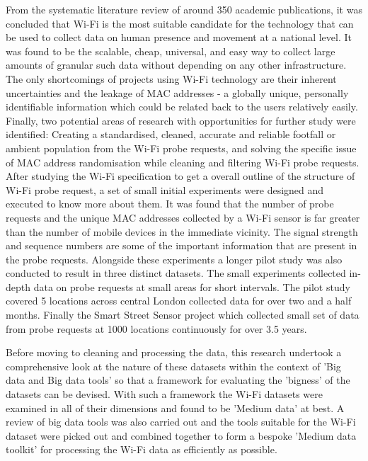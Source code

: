 From the systematic literature review of around 350 academic publications, it was concluded that Wi-Fi is the most suitable candidate for the technology that can be used to collect data on human presence and movement at a national level.
It was found to be the scalable, cheap, universal, and easy way to collect large amounts of granular such data without depending on any other infrastructure.
The only shortcomings of projects using Wi-Fi technology are their inherent uncertainties and the leakage of MAC addresses - a globally unique, personally identifiable information which could be related back to the users relatively easily.
Finally, two potential areas of research with opportunities for further study were identified:  Creating a standardised, cleaned, accurate and reliable footfall or ambient population from the Wi-Fi probe requests, and solving the specific issue of MAC address randomisation while cleaning and filtering Wi-Fi probe requests. 
After studying the Wi-Fi specification to get a overall outline of the structure of Wi-Fi probe request, a set of small initial experiments were designed and executed to know more about them.
It was found that the number of probe requests and the unique MAC addresses collected by a Wi-Fi sensor is far greater than the number of mobile devices in the immediate vicinity.
The signal strength and sequence numbers are some of the important information that are present in the probe requests.
Alongside these experiments a longer pilot study was also conducted to result in three distinct datasets.
The small experiments collected in-depth data on probe requests at small areas for short intervals.
The pilot study covered 5 locations across central London collected data for over two and a half months.
Finally the Smart Street Sensor project which collected small set of data from probe requests at 1000 locations continuously for over 3.5 years.

Before moving to cleaning and processing the data, this research undertook a comprehensive look at the nature of these datasets within the context of 'Big data and Big data tools' so that a framework for evaluating the 'bigness' of the datasets can be devised.
With such a framework the Wi-Fi datasets were examined in all of their dimensions and found to be 'Medium data' at best.
A review of big data tools was also carried out and the tools suitable for the Wi-Fi dataset were picked out and combined together to form a bespoke 'Medium data toolkit' for processing the Wi-Fi data as efficiently as possible.

